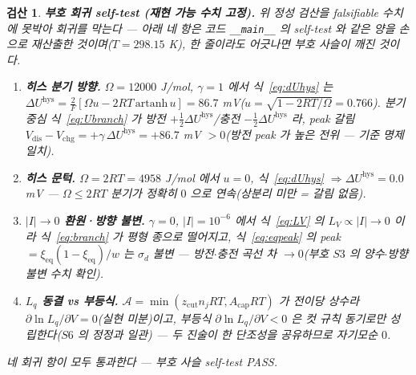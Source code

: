 \documentclass[11pt,a4paper]{article}
\newtheorem*{verifybox}{검산}
\newcommand{\eq}{\mathrm{eq}}
\newcommand{\dis}{\mathrm{dis}}
\newcommand{\chg}{\mathrm{chg}}
\newcommand{\hys}{\mathrm{hys}}
\newcommand{\code}[1]{\texttt{#1}}
\begin{document}
\begin{verifybox}
\textbf{부호 회귀 self-test (재현 가능 수치 고정).} 위 정성 검산을 falsifiable 수치에 못박아 회귀를 막는다 — 아래
네 항은 코드 \code{\_\_main\_\_} 의 self-test 와 같은 양을 손으로 재산출한 것이며($T=298.15$ K), 한 줄이라도 어긋나면
부호 사슬이 깨진 것이다.
\begin{enumerate}[label=\textbf{R\arabic*.},leftmargin=2.6em,itemsep=1pt]
\item \textbf{히스 분기 방향.} $\Omega=12000$ J/mol, $\gamma=1$ 에서 식~\eqref{eq:dUhys} 는
$\Delta U^\hys=\frac{2}{F}[\Omega u-2RT\,\mathrm{artanh}\,u]=86.7$ mV($u=\sqrt{1-2RT/\Omega}=0.766$). 분기 중심
식~\eqref{eq:Ubranch} 가 방전 $+\tfrac12\Delta U^\hys$/충전 $-\tfrac12\Delta U^\hys$ 라, peak 갈림
$V_\dis-V_\chg=+\gamma\,\Delta U^\hys=+86.7$ mV $>0$(방전 peak 가 높은 전위 — 기준 명제 일치).
\item \textbf{히스 문턱.} $\Omega=2RT=4958$ J/mol 에서 $u=0$, 식~\eqref{eq:dUhys} $\Rightarrow\Delta U^\hys=0.0$ mV —
$\Omega\le2RT$ 분기가 정확히 $0$ 으로 연속(상분리 미만 = 갈림 없음).
\item \textbf{$|I|\!\to\!0$ 환원·방향 불변.} $\gamma=0$, $|I|=10^{-6}$ 에서 식~\eqref{eq:LV} 의 $L_V\propto|I|\to0$ 이라
식~\eqref{eq:branch} 가 평형 종으로 떨어지고, 식~\eqref{eq:eqpeak} 의 peak $=\xi_\eq(1-\xi_\eq)/w$ 는 $\sigma_d$ 불변 —
방전$\cdot$충전 곡선 차 $\to0$(부호 $S3$ 의 양수$\cdot$방향 불변 수치 확인).
\item \textbf{$L_q$ 동결 vs 부등식.} $\mathcal A=\min(z_\mathrm{cut}n_jRT,A_\mathrm{cap}RT)$ 가 전이당 상수라
$\partial\ln L_q/\partial V=0$(실현 미분)이고, 부등식 $\partial\ln L_q/\partial V<0$ 은 컷 규칙 동기로만 성립한다($S6$ 의
정정과 일관) — 두 진술이 한 단조성을 공유하므로 자기모순 $0$.
\end{enumerate}
네 회귀 항이 모두 통과한다 — 부호 사슬 self-test PASS.
\end{verifybox}
\end{document}
